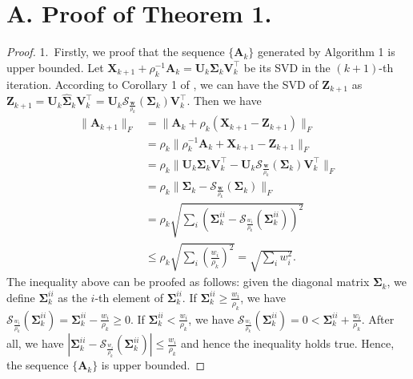 \documentclass[10pt,twocolumn,letterpaper,sort&compress]{article}
\begin{document}
\section{A. Proof of Theorem 1.}
\begin{proof}
1.\ Firstly, we proof that the sequence $\{\mathbf{A}_{k}\}$ generated by Algorithm 1 is upper bounded.
Let $\mathbf{X}_{k+1}+\rho_{k}^{-1}\mathbf{A}_{k}
=
\mathbf{U}_{k}\mathbf{\Sigma}_{k}\mathbf{V}_{k}^{\top}$
be its SVD in the $(k+1)$-th iteration. According to Corollary 1 of \cite{wnnmijcv}, we can have the SVD of $\mathbf{Z}_{k+1}$ as $\mathbf{Z}_{k+1}=\mathbf{U}_{k}\hat{\mathbf{\Sigma}}_{k}\mathbf{V}_{k}^{\top}=\mathbf{U}_{k}\mathcal{S}_{\frac{\bm{w}}{\rho_{k}}}(\mathbf{\Sigma}_{k})\mathbf{V}_{k}^{\top}$. 
Then we have 
\begin{align}
\|
\mathbf{A}_{k+1}
\|_{F}
&
=
\|
\mathbf{A}_{k}
+
\rho_{k}
(\mathbf{X}_{k+1}-\mathbf{Z}_{k+1})
\|_{F}
\\
&
=
\rho_{k}\|
\rho_{k}^{-1}
\mathbf{A}_{k}
+
\mathbf{X}_{k+1}
-
\mathbf{Z}_{k+1}
\|_{F}
\\
&
=
\rho_{k}\|
\mathbf{U}_{k}\mathbf{\Sigma}_{k}\mathbf{V}_{k}^{\top}
-
\mathbf{U}_{k}\mathcal{S}_{\frac{\bm{w}}{\rho_{k}}}(\mathbf{\Sigma}_{k})\mathbf{V}_{k}^{\top}
\|_{F}
\\
&
=
\rho_{k}\|
\mathbf{\Sigma}_{k}
-
\mathcal{S}_{\frac{\bm{w}}{\rho_{k}}}(\mathbf{\Sigma}_{k})
\|_{F}
\\
&
=
\rho_{k}
\sqrt{\sum_{i}(\mathbf{\Sigma}_{k}^{ii}-\mathcal{S}_{\frac{w_{i}}{\rho_{k}}}(\mathbf{\Sigma}_{k}^{ii}))^{2}}
\\
&
\le
\rho_{k}
\sqrt{\sum_{i}(\frac{w_{i}}{\rho_{k}})^{2}}
=
\sqrt{\sum_{i}w_{i}^{2}}.
\end{align}
The inequality above can be proofed as follows: given the diagonal matrix $\mathbf{\Sigma}_{k}$, we define $\mathbf{\Sigma}_{k}^{ii}$ as the $i$-th element of $\mathbf{\Sigma}_{k}^{ii}$. If $\mathbf{\Sigma}_{k}^{ii}\ge\frac{w_{i}}{\rho_{k}}$, we have $\mathcal{S}_{\frac{w_{i}}{\rho_{k}}}(\mathbf{\Sigma}_{k}^{ii})=\mathbf{\Sigma}_{k}^{ii}-\frac{w_{i}}{\rho_{k}}\ge 0$. If $\mathbf{\Sigma}_{k}^{ii}<\frac{w_{i}}{\rho_{k}}$, we have $\mathcal{S}_{\frac{w_{i}}{\rho_{k}}}(\mathbf{\Sigma}_{k}^{ii})=0<\mathbf{\Sigma}_{k}^{ii}+\frac{w_{i}}{\rho_{k}}$. After all, we have $|\mathbf{\Sigma}_{k}^{ii}-\mathcal{S}_{\frac{w_{i}}{\rho_{k}}}(\mathbf{\Sigma}_{k}^{ii})|\le\frac{w_{i}}{\rho_{k}}$ and hence the inequality holds true. Hence, the sequence $\{\mathbf{A}_{k}\}$ is upper bounded.


\end{proof}
\end{document}

